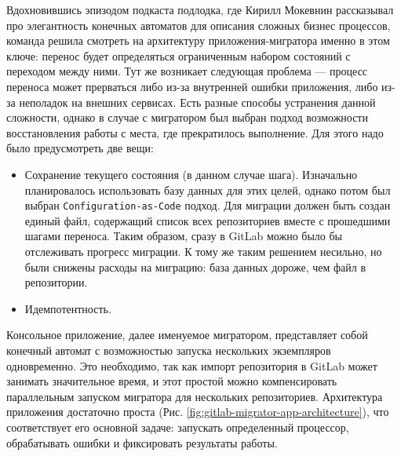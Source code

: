 Вдохновившись эпизодом\cite{podlodka-podcast} подкаста подлодка,
где Кирилл Мокевнин рассказывал про элегантность конечных автоматов\cite{fsm} для описания сложных бизнес процессов,
команда решила смотреть на архитектуру приложения-мигратора именно в этом ключе:
перенос будет определяться ограниченным набором состояний с переходом между ними.
Тут же возникает следующая проблема — процесс переноса может прерваться либо из-за внутренней ошибки приложения, либо из-за неполадок на внешних сервисах.
Есть разные способы устранения данной сложности, однако в случае с мигратором был выбран подход возможности восстановления работы с места, где прекратилось выполнение.
Для этого надо было предусмотреть две вещи:
\begin{itemize}
  \item Сохранение текущего состояния (в данном случае шага).
        Изначально планировалось использовать базу данных для этих целей, однако потом был выбран \texttt{Configuration-as-Code} подход\cite{cac}.
        Для миграции должен быть создан единый файл, содержащий список всех репозиториев вместе с прошедшими шагами переноса.
        Таким образом, сразу в GitLab можно было бы отслеживать прогресс миграции.
        К тому же таким решением несильно, но были снижены расходы на миграцию: база данных дороже, чем файл в репозитории.
  \item Идемпотентность\cite{idempotence}.
\end{itemize}

Консольное приложение, далее именуемое мигратором, представляет собой конечный автомат\cite{fsm} с возможностью запуска нескольких экземпляров одновременно.
Это необходимо, так как импорт репозитория в GitLab может занимать значительное время, и этот простой можно компенсировать параллельным запуском мигратора для нескольких репозиториев.
Архитектура приложения достаточно проста (Рис. \ref{fig:gitlab-migrator-app-architecture}), что соответствует его основной задаче: запускать определенный процессор, обрабатывать ошибки и фиксировать результаты работы.

